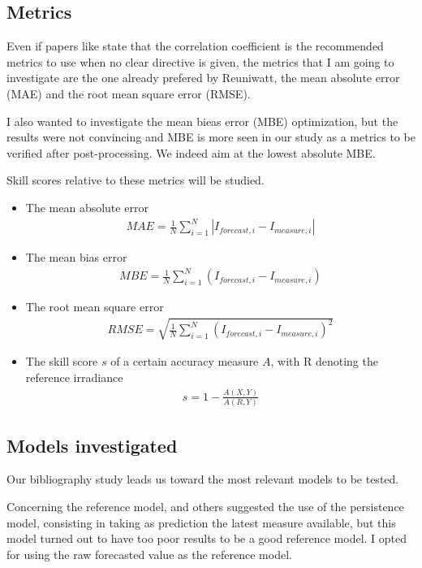 \subsection{Metrics}
Even if papers like \cite{mayer_calibration_2023} state that the correlation coefficient is the recommended metrics to use when no clear directive is given, the metrics 
that I am going to investigate are the one already prefered by Reuniwatt, the mean absolute error (MAE) and the root mean square error (RMSE). 

I also wanted to investigate the mean bieas error (MBE) optimization, but the results were not convincing and MBE is more seen in our study as a metrics to be verified after post-processing.
We indeed aim at the lowest absolute MBE.

Skill scores relative to these metrics will be studied.
\begin{itemize}
    \item The mean absolute error \begin{align*}
        MAE = \frac{1}{N} \sum_{i=1}^{N} | I_{forecast, i} - I_{measure, i} |
    \end{align*}

    \item The mean bias error \begin{align*}
        MBE = \frac{1}{N} \sum_{i=1}^{N} ( I_{forecast, i} - I_{measure, i} )
    \end{align*}

    \item The root mean square error \begin{align*}
        RMSE = \sqrt{\frac{1}{N} \sum_{i=1}^{N} ( I_{forecast, i} - I_{measure, i} ) ^{2}}
    \end{align*}

    \item The skill score $s$  of a certain accuracy measure $A$, with R denoting the reference irradiance
    \begin{align*}
        s = 1 - \frac{A(X,Y)}{A(R,Y)}
    \end{align*}
\end{itemize}

\subsection{Models investigated}\label{subsec:models}
Our bibliography study leads us toward the most relevant models to be tested.

Concerning the reference model, \cite{lorenz_benchmarking_nodate} and others suggested the use of the persistence model, consisting in taking as prediction the latest measure available,
but this model turned out to have too poor results to be a good reference model. I opted for using the raw forecasted value as the reference model.

